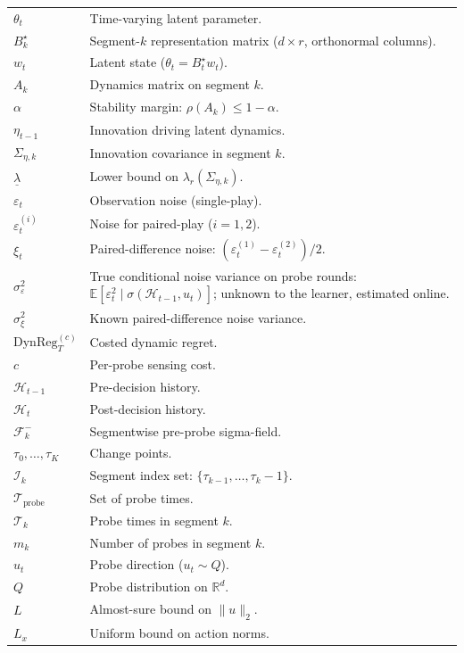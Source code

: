 \documentclass[12pt]{article}
\newcommand{\R}{\mathbb{R}}
\newcommand{\E}{\mathbb{E}}
\newcommand{\cF}{\mathcal{F}}
\newcommand{\cH}{\mathcal{H}}
\newcommand{\cT}{\mathcal{T}}
\newcommand{\cI}{\mathcal{I}}
\newcommand{\cTprobe}{\mathcal{T}_{\mathrm{probe}}}
\newcommand{\DynReg}{\mathrm{DynReg}}
\theoremstyle{plain}
\theoremstyle{definition}
\begin{document}
\begin{appendix}
\begin{center}
\begin{longtable}{l p{}}
$\theta_t$ & Time-varying latent parameter. \\
$B_k^\star$ & Segment-$k$ representation matrix ($d \times r$, orthonormal columns). \\
$w_t$ & Latent state ($\theta_t = B_t^\star w_t$). \\
$A_k$ & Dynamics matrix on segment $k$. \\
$\alpha$ & Stability margin: $\rho(A_k) \le 1 - \alpha$. \\
$\eta_{t-1}$ & Innovation driving latent dynamics. \\
$\Sigma_{\eta,k}$ & Innovation covariance in segment $k$. \\
$\underline{\lambda}$ & Lower bound on $\lambda_r(\Sigma_{\eta,k})$. \\

$\varepsilon_t$ & Observation noise (single-play). \\
$\varepsilon_t^{(i)}$ & Noise for paired-play ($i = 1, 2$). \\
$\xi_t$ & Paired-difference noise: $(\varepsilon_t^{(1)} - \varepsilon_t^{(2)})/2$. \\
$\sigma_\varepsilon^2$ & True conditional noise variance on probe rounds: $\E[\varepsilon_t^2 \mid \sigma(\cH_{t-1}, u_t)]$; unknown to the learner, estimated online. \\
$\sigma_\xi^2$ & Known paired-difference noise variance. \\

$\DynReg_T^{(c)}$ & Costed dynamic regret. \\
$c$ & Per-probe sensing cost. \\

$\cH_{t-1}$ & Pre-decision history. \\
$\cH_t$ & Post-decision history. \\
$\cF_k^-$ & Segmentwise pre-probe sigma-field. \\

$\tau_0, \dots, \tau_K$ & Change points. \\
$\cI_k$ & Segment index set: $\{\tau_{k-1}, \dots, \tau_k - 1\}$. \\

$\cTprobe$ & Set of probe times. \\
$\cT_k$ & Probe times in segment $k$. \\
$m_k$ & Number of probes in segment $k$. \\

$u_t$ & Probe direction ($u_t \sim Q$). \\
$Q$ & Probe distribution on $\R^d$. \\
$L$ & Almost-sure bound on $\|u\|_2$. \\
$L_x$ & Uniform bound on action norms. \\


\end{longtable}
\end{center}
\end{appendix}
\end{document}
